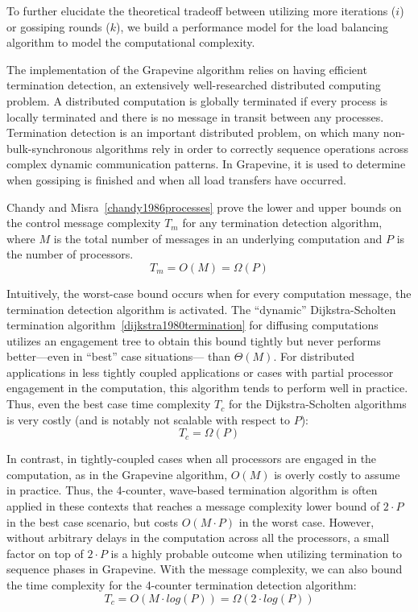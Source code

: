 To further elucidate the theoretical tradeoff between utilizing more iterations
($i$) or gossiping rounds ($k$), we build a performance model for the load
balancing algorithm to model the computational complexity.

The implementation of the \textsf{Grapevine} algorithm relies on having
efficient termination detection, an extensively well-researched distributed
computing problem. A distributed computation is globally terminated if every
process is locally terminated and there is no message in transit between any
processes. Termination detection is an important distributed problem,
on which many non-bulk-synchronous algorithms rely in order to
correctly sequence operations across complex dynamic communication
patterns.
In \textsf{Grapevine}, it is used to determine when gossiping is
finished and when all load transfers have occurred.

Chandy and Misra~\ref{chandy1986processes} prove the lower and upper bounds on
the control message complexity $T_m$ for any termination detection algorithm,
where $M$ is the total number of messages in an underlying computation and $P$
is the number of processors.
\[
T_m = O(M) = \Omega(P)
\]

Intuitively, the worst-case bound occurs when for every computation message, the
termination detection algorithm is activated. The ``dynamic'' Dijkstra-Scholten
termination algorithm~\ref{dijkstra1980termination} for diffusing computations
utilizes an engagement tree to obtain this bound tightly but never performs
better---even in ``best'' case situations--- than $\Theta(M)$. For distributed
applications in less tightly coupled applications or cases with partial
processor engagement in the computation, this algorithm tends to perform well in
practice. Thus, even the best case time complexity $T_c$ for the
Dijkstra-Scholten algorithms is very costly (and is notably not scalable with
respect to $P$):
\[
T_c = \Omega(P)
\]

In contrast, in tightly-coupled cases when all processors are engaged in the
computation, as in the \textsf{Grapevine} algorithm, $O(M)$ is overly costly to
assume in practice. Thus, the 4-counter, wave-based termination algorithm is
often applied in these contexts that reaches a message complexity lower bound of
$2\cdot P$ in the best case scenario, but costs $O(M\cdot P)$ in the worst
case. However, without arbitrary delays in the computation across all the
processors, a small factor on top of $2\cdot P$ is a highly probable outcome
when utilizing termination to sequence phases in \textsf{Grapevine}. With the
message complexity, we can also bound the time complexity for the 4-counter
termination detection algorithm:
\[
T_c = O(M\cdot log(P)) = \Omega(2\cdot log(P))
\]

